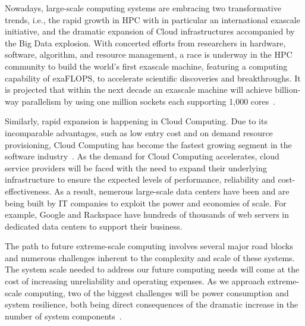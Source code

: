 Nowadays, large-scale computing systems are embracing two transformative trends, i.e., the rapid growth
in HPC with in particular an international
exascale initiative, and the dramatic expansion of Cloud infrastructures accompanied by the Big Data explosion. 
With concerted efforts from researchers in hardware, software, algorithm, and resource management, a race
is underway in the HPC community to build the world's first exascale machine, featuring a computing capability of exaFLOPS, 
to accelerate scientific discoveries and breakthroughs. It is 
projected that within the next decade an exascale machine will achieve billion-way parallelism by using one million sockets each supporting 
1,000 cores~\cite{doe_ascr_exascale_2011,top_ten_2014}. 

Similarly, rapid expansion is happening in Cloud Computing.  
Due to its incomparable advantages, such as low entry cost and on demand resource provisioning, 
Cloud Computing has become the fastest growing segment in the software industry~\cite{anderson2013forecast}.
As the demand for Cloud Computing accelerates, cloud service providers  
will be faced with the need to expand their underlying infrastructure to ensure the expected levels of performance, reliability and cost-effectiveness. 
As a result, nemerous large-scale data centers have been and are being built by IT companies
to exploit the power and economies of scale. 
For example, Google and Rackspace have hundreds of thousands 
of web servers in dedicated data centers to support their business. 

The path to future extreme-scale computing involves several major road blocks and numerous challenges inherent 
to the complexity and scale of these systems. 
The system scale needed to address our future computing needs will come at the cost of increasing unreliability 
and operating expenses. As we approach extreme-scale computing, two of the biggest challenges will be power 
consumption and system resilience, both being direct consequences of the dramatic increase in the 
number of system components~\cite{exa_challenge_2010,snir2014addressing}. 


